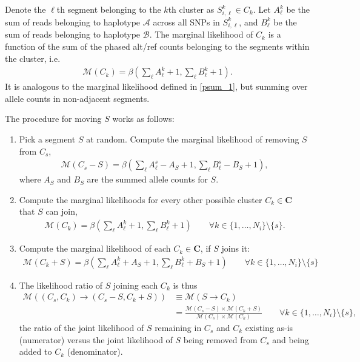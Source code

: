 \documentclass[10pt,letter]{article}
\numberwithin{equation}{section}
\begin{document}
Denote the $\ell$th segment belonging to the $k$th cluster as $S^k_{i,\ell}\in C_k$. Let $A^k_\ell$ be the sum of reads belonging to haplotype $\mathcal A$ across all SNPs in $S^k_{i,\ell}$, and $B^k_\ell$ be the sum of reads belonging to haplotype $\mathcal B$. 
The marginal likelihood of $C_k$ is a function of the sum of the phased alt/ref counts belonging to the segments within the cluster, i.e.
\begin{align*}
\mathcal{M}(C_k) = \beta(\textstyle\sum_\ell A^k_\ell + 1, \textstyle\sum_\ell  B^k_\ell + 1).
\end{align*}
It is analogous to the marginal likelihood defined in \eqref{psum_1}, but summing over allele counts in non-adjacent segments.

The procedure for moving $S$ works as follows:

\begin{enumerate}
\item Pick a segment $S$ at random. Compute the marginal likelihood of removing $S$ from $C_s$,
\begin{align*}
\mathcal{M}(C_s-S) = \beta(\textstyle\sum_\ell A^s_\ell - A_S + 1, \textstyle\sum_\ell B^s_\ell - B_S + 1),
\end{align*}
where $A_S$ and $B_S$ are the summed allele counts for $S$.
\item Compute the marginal likelihoods for every other possible cluster $C_k\in\mathbf{C}$ that $S$ can join,
\begin{align*}
\mathcal{M}(C_k) = \beta(\textstyle\sum_\ell A^k_{\ell} + 1, \textstyle\sum_\ell B^k_{\ell} + 1)\qquad \forall k\in\{1,\dots,N_i\}\setminus\{s\}.
\end{align*}
\item Compute the marginal likelihood of each $C_k\in\mathbf{C}$, if $S$ joins it:
\begin{align*}
\mathcal{M}(C_k+S) = \beta(\textstyle\sum_\ell A^k_{\ell} + A_S + 1, \textstyle\sum_\ell B^k_{\ell} + B_S + 1)\qquad \forall k\in\{1,\dots,N_i\}\setminus\{s\}
\end{align*}
\item The likelihood ratio of $S$ joining each $C_k$ is thus
\begin{align*}
\mathcal{M}((C_s,C_k)\to (C_s-S,C_k+S)) &\equiv\mathcal{M}(S\to C_k)\\
&= \frac{\mathcal{M}(C_s-S)\times\mathcal{M}(C_k+S)}{\mathcal{M}(C_s)\times\mathcal{M}(C_k)}\qquad \forall k\in\{1,\dots,N_i\}\setminus\{s\},
\end{align*}
the ratio of the joint likelihood of $S$ remaining in $C_s$ and $C_k$ existing as-is (numerator) versus the joint likelihood of $S$ being removed from $C_s$ and being added to $C_k$ (denominator).

\end{enumerate}
\end{document}
